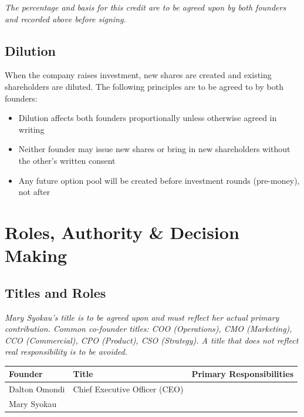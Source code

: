\documentclass[12pt,a4paper]{article}
\newcommand{\blank}[1][5.5cm]{\underline{\hspace{#1}}}
\begin{document}
\begin{notebox}
\textit{The percentage and basis for this credit are to be agreed upon by both founders and recorded above before signing.}
\end{notebox}

\subsection{Dilution}

When the company raises investment, new shares are created and existing shareholders are diluted. The following principles are to be agreed to by both founders:

\begin{itemize}
  \item Dilution affects both founders proportionally unless otherwise agreed in writing
  \item Neither founder may issue new shares or bring in new shareholders without the other's written consent
  \item Any future option pool will be created before investment rounds (pre-money), not after
\end{itemize}

\section{Roles, Authority \& Decision Making}

\subsection{Titles and Roles}

\begin{notebox}
\textit{Mary Syokau's title is to be agreed upon and must reflect her actual primary contribution. Common co-founder titles: COO (Operations), CMO (Marketing), CCO (Commercial), CPO (Product), CSO (Strategy). A title that does not reflect real responsibility is to be avoided.}
\end{notebox}

\begin{tabularx}{\linewidth}{L{3.5cm} L{3.5cm} X}
  \toprule
  \textbf{Founder} & \textbf{Title} & \textbf{Primary Responsibilities} \\
  \midrule
  Dalton Omondi & Chief Executive Officer (CEO) & \blank[6cm] \\[0.5em]
  Mary Syokau   & \blank[3cm]                  & \blank[6cm] \\
  \bottomrule
\end{tabularx}
\end{document}
